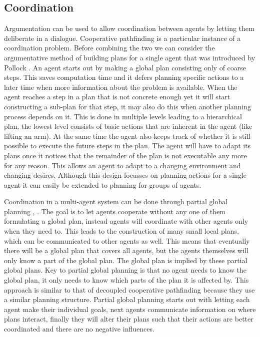 \subsection{Coordination}
Argumentation can be used to allow coordination between agents by letting them
deliberate in a dialogue. Cooperative pathfinding is a particular instance of a
coordination problem. Before combining the two we can consider the
argumentative method of building plans for a single agent that was introduced
by Pollock \cite{pollock1995}. An agent starts out by  making a global plan
consisting only of coarse steps. This saves computation time and it defers
planning specific actions to a later time when more information about the
problem is available. When the agent reaches a step in a plan that is not
concrete enough yet it will start constructing a sub-plan for that step, it may
also do this when another planning process depends on it. This is done in
multiple levels leading to a hierarchical plan, the lowest level consists of
basic actions that are inherent in the agent (like lifting an arm). At the same
time the agent also keeps track of whether it is still possible to execute the
future steps in the plan. The agent will have to adapt its plans once it
notices that the remainder of the plan is not executable any more for any
reason. This allows an agent to adapt to a changing environment and changing
desires. Although this design focusses on planning actions for a single agent
it can easily be extended to planning for groups of agents.

Coordination in a multi-agent system can be done through partial global
planning \cite[pp. 202--204]{woodridge2009}, \cite{durfee1991}. The goal is to
let agents cooperate without any one of them formulating a global plan, instead
agents will coordinate with other agents only when they need to. This leads to
the construction of many small local plans, which can be communicated to other
agents as well. This means that eventually there will be a global plan that
covers all agents, but the agents themselves will only know a part of the
global plan. The global plan is implied by these partial global plans. Key to
partial global planning is that no agent needs to know the global plan, it only
needs to know which parts of the plan it is affected by. This approach is
similar to that of decoupled cooperative pathfinding because they use a similar
planning structure. Partial global planning starts out with letting each agent
make their individual goals, next agents communicate information on where plans
interact, finally they will alter their plans such that their actions are
better coordinated and there are no negative influences.